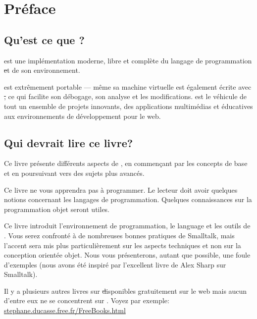 \documentclass[a4paper,10pt,twoside]{book}
\begin{document}
\fi
\renewcommand{\nnbb}[2]{} %
\sloppy
\chapter{Pr\'eface}\label{cha:intro}

\section*{Qu'est ce que \sq?}

\sq est une impl\'ementation moderne, libre et compl\`ete du langage de programmation \st et de son environnement.

\sq est extr\^emement portable --- m\^eme sa machine virtuelle est \'egalement \'ecrite avec \st, ce qui facilite son d\'ebogage, son analyse et les modifications. \sq est le v\'ehicule de tout un ensemble de projets innovants, des applications multim\'edias et \'educatives aux environnements de d\'eveloppement pour le web.

\section*{Qui devrait lire ce livre?}

Ce livre pr\'esente diff\'erents aspects de \sq, en commen\c{c}ant par les concepts de base et en poursuivant vers des sujets plus avanc\'es.

Ce livre ne vous apprendra pas \`a programmer. Le lecteur doit avoir quelques notions concernant les langages de programmation. Quelques connaissances sur la programmation objet seront utiles.

Ce livre introduit l'environnement de programmation, le language et
les outils de \sq. Vous serez confront\'e \`a de nombreuses bonnes
pratiques de Smalltalk, mais l'accent sera mis plus particuli\`erement
sur les aspects techniques et non sur la conception orient\'ee
objet. Nous vous pr\'esenterons, autant que possible, une foule 
d'exemples (nous avons \'et\'e inspir\'e par l'excellent livre de Alex
Sharp sur Smalltalk\cite{Shar97a}).

Il y a plusieurs autres livres sur \st disponibles gratuitement sur le web mais aucun d'entre eux ne se concentrent sur \sq. Voyez par exemple:
\url{stephane.ducasse.free.fr/FreeBooks.html}
\end{document}
